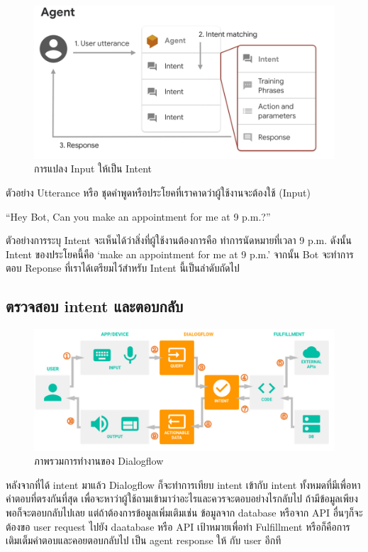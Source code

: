 \begin{figure}[hbt!]
  \begin{center}
    \includegraphics[width=\textwidth,keepaspectratio]{pic/df_input_intent_conventer.png}
  \end{center}
  \caption{การแปลง Input ให้เป็น Intent}
  \label{fig:df-TTI}
\end{figure}
ตัวอย่าง Utterance หรือ ชุดคำพูดหรือประโยคที่เราคาดว่าผู้ใช้งานจะต้องใช้ (Input)
\begin{center}
``Hey Bot, Can you make an appointment for me at 9 p.m.?''
\end{center}
ตัวอย่างการระบุ Intent จะเห็นได้ว่าสิ่งที่ผู้ใช้งานต้องการคือ ทำการนัดหมายที่เวลา 9 p.m. ดังนั้น 
Intent ของประโยคนี้คือ `make an appointment for me at 9 p.m.' จากนั้น Bot 
จะทำการตอบ  Reponse ที่เราได้เตรียมไว้สำหรับ Intent นี้เป็นลำดับถัดไป
\subsection{ตรวจสอบ intent และตอบกลับ}

\begin{figure}[hbt!]
  \begin{center}
    \includegraphics[width=\textwidth,keepaspectratio]{pic/df-overview.jpg}
  \end{center}
  \caption{ภาพรวมการทำงานของ Dialogflow}
  \label{fig:df-overview}
\end{figure}
หลังจากที่ได้ intent มาแล้ว Dialogflow ก็จะทำการเทียบ intent เข้ากับ intent ทั้งหมดที่มีเพื่อหาคำตอบที่ตรงกันที่สุด
เพื่อจะหาว่าผู้ใช้ถามเข้ามาว่าอะไรและควรจะตอบอย่างไรกลับไป
ถ้ามีข้อมูลเพียงพอก็จะตอบกลับไปเลย แต่ถ้าต้องการข้อมูลเพิ่มเติมเช่น ข้อมูลจาก database หรือจาก API อื่นๆก็จะต้องขอ
user request ไปยัง daatabase หรือ API เป้าหมายเพื่อทำ Fulfillment หรือก็คือการเติมเต็มคำตอบและคอยตอบกลับไป
เป็น agent response ให้ กับ user อีกที



